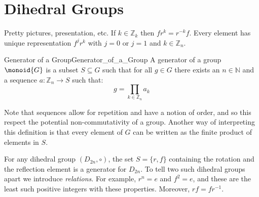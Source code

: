 \section{Dihedral Groups}
    Pretty pictures, presentation, etc. If $k\in\mathbb{Z}_{k}$ then
    $fr^{k}=r^{\minus{k}}f$. Every element has unique representation
    $f^{j}r^{k}$ with $j=0$ or $j=1$ and $k\in\mathbb{Z}_{n}$.
    \begin{fdefinition}{Generator of a Group}{Generator_of_a_Group}
        A generator of a group $\monoid{G}$ is a subset $S\subseteq{G}$
        such that for all $g\in{G}$ there exists an $n\in\mathbb{N}$ and
        a sequence $a:\mathbb{Z}_{n}\rightarrow{S}$ such that:
        \begin{equation*}
            g=\prod_{k\in\mathbb{Z}_{n}}a_{k}
        \end{equation*}
    \end{fdefinition}
    Note that sequences allow for repetition and have a notion of order,
    and so this respect the potential non-commutativity of a group.
    Another way of interpreting this definition is that every element of
    $G$ can be written as the finite product of elements in $S$.
    \begin{example}
        For any dihedral group $(D_{2n},\circ)$, the set
        $S=\{r,f\}$ containing the rotation and the reflection element
        is a generator for $D_{2n}$. To tell two such dihedral groups
        apart we introduce \textit{relations}. For example, $r^{n}=e$
        and $f^{2}=e$, and these are the least such positive integers
        with these properties. Moreover, $rf=fr^{\minus{1}}$.
    \end{example}
